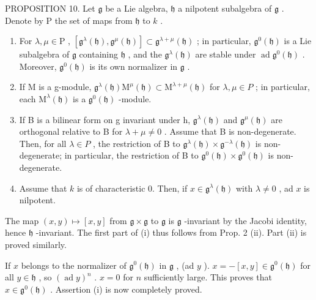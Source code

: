 PROPOSITION 10. Let \(\mathfrak{g}\) be a Lie algebra, \(\mathfrak{h}\) a nilpotent subalgebra of \(\mathfrak{g}\) . Denote by P the set of maps from \(\mathfrak{h}\) to \(k\) .

\begin{enumerate}
\def\labelenumi{(\roman{enumi})}
\item
  For \(\lambda, \mu \in \mathrm{P}\) , \([\mathfrak{g}^{\lambda}(\mathfrak{h}), \mathfrak{g}^{\mu}(\mathfrak{h})] \subset \mathfrak{g}^{\lambda + \mu}(\mathfrak{h})\) ; in particular, \(\mathfrak{g}^{0}(\mathfrak{h})\) is a Lie subalgebra of \(\mathfrak{g}\) containing \(\mathfrak{h}\) , and the \(\mathfrak{g}^{\lambda}(\mathfrak{h})\) are stable under \(\operatorname{ad} \mathfrak{g}^{0}(\mathfrak{h})\) . Moreover, \(\mathfrak{g}^{0}(\mathfrak{h})\) is its own normalizer in \(\mathfrak{g}\) .
\item
  If M is a g-module, \(\mathfrak{g}^{\lambda}(\mathfrak{h})\mathrm{M}^{\mu}(\mathfrak{h})\subset\mathrm{M}^{\lambda+\mu}(\mathfrak{h})\) for \(\lambda,\mu\in P\) ; in particular, each \(\mathrm{M}^{\lambda}(\mathfrak{h})\) is a \(\mathfrak{g}^{0}(\mathfrak{h})\) -module.
\item
  If B is a bilinear form on g invariant under h, \(\mathfrak{g}^{\lambda}(\mathfrak{h})\) and \(\mathfrak{g}^{\mu}(\mathfrak{h})\) are orthogonal relative to B for \(\lambda + \mu \neq 0\) . Assume that B is non-degenerate. Then, for all \(\lambda \in P\) , the restriction of B to \(\mathfrak{g}^{\lambda}(\mathfrak{h}) \times \mathfrak{g}^{-\lambda}(\mathfrak{h})\) is non-degenerate; in particular, the restriction of B to \(\mathfrak{g}^{0}(\mathfrak{h}) \times \mathfrak{g}^{0}(\mathfrak{h})\) is non-degenerate.
\item
  Assume that \(k\) is of characteristic 0. Then, if \(x \in \mathfrak{g}^{\lambda}(\mathfrak{h})\) with \(\lambda \neq 0\) , ad \(x\) is nilpotent.
\end{enumerate}

The map \((x,y)\mapsto [x,y]\) from \(\mathfrak{g}\times \mathfrak{g}\) to \(\mathfrak{g}\) is \(\mathfrak{g}\) -invariant by the Jacobi identity, hence \(\mathfrak{h}\) -invariant. The first part of (i) thus follows from Prop. 2 (ii). Part (ii) is proved similarly.

If \(x\) belongs to the normalizer of \(\mathfrak{g}^0(\mathfrak{h})\) in \(\mathfrak{g}\) , (ad \(y\) ). \(x = -[x, y] \in \mathfrak{g}^0(\mathfrak{h})\) for all \(y \in \mathfrak{h}\) , so \((\operatorname{ad} y)^n\) . \(x = 0\) for \(n\) sufficiently large. This proves that \(x \in \mathfrak{g}^0(\mathfrak{h})\) . Assertion (i) is now completely proved.

